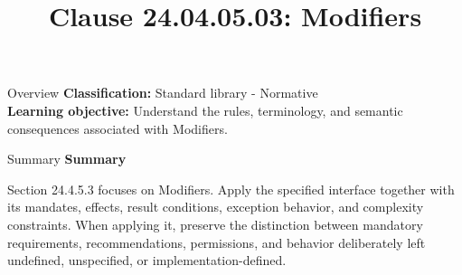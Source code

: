 \documentclass[10pt,letterpaper]{article}
\title{Clause 24.04.05.03: Modifiers}
\author{}
\date{}
\begin{document}
\maketitle
\begin{CornellOverviewBox}{Overview}
\textbf{Classification:} Standard library - Normative\\[2pt]
\textbf{Learning objective:} Understand the rules, terminology, and semantic consequences associated with Modifiers.
\end{CornellOverviewBox}\begin{CornellSummaryBox}{Summary}
{\sffamily\bfseries\color{Accent} Summary}\par\vspace{3pt}Section 24.4.5.3 focuses on Modifiers. Apply the specified interface together with its mandates, effects, result conditions, exception behavior, and complexity constraints. When applying it, preserve the distinction between mandatory requirements, recommendations, permissions, and behavior deliberately left undefined, unspecified, or implementation-defined.
\end{CornellSummaryBox}
\end{document}
